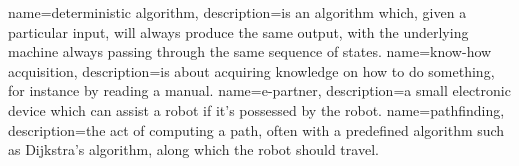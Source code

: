 {
  name=deterministic algorithm,
  description={is an algorithm which, given a particular input,
  		 will always produce the same output, with the 
  		 underlying machine always passing through 
  		 the same sequence of states. }
}
{
  name=know-how acquisition,
  description={is about acquiring knowledge on how to do something, for 				instance by reading a manual. }
}
{
  name=e-partner,
  description={a small electronic device which can assist a robot if it's 			possessed by the robot. }
}
{
  name=pathfinding,
  description={the act of computing a path, often with a predefined 					algorithm such as Dijkstra's algorithm, along which the robot 			should travel. }
}